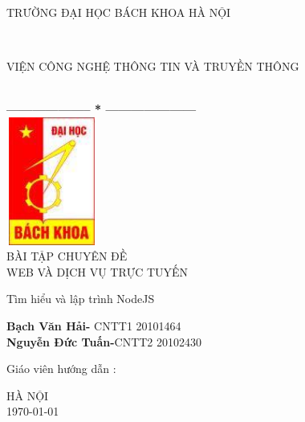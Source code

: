 ﻿\thispagestyle{empty}
\thisfancypage{
\setlength{\fboxsep}{0pt}
\fbox}{} 
\begin{center}
    \begin{large}
        \textcolor[rgb]{1.00,0.00,0.00}{TRƯỜNG ĐẠI HỌC BÁCH KHOA HÀ NỘI}
    \end{large} \\
    \begin{large}
        \textcolor[rgb]{1.00,0.00,0.00}{VIỆN CÔNG NGHỆ THÔNG TIN VÀ TRUYỀN THÔNG}
    \end{large} \\

    \textbf{--------------------  *  ---------------------}\\[2cm]

    \includegraphics[width=3cm, height=4.2cm]{logo}\\[1cm]
    {\fontsize{32pt}{1}\selectfont BÀI TẬP CHUYÊN ĐỀ}\\
    {\fontsize{20pt}{1}\selectfont WEB VÀ DỊCH VỤ TRỰC TUYẾN}\\[2cm]
\end{center}

\hspace{5cm}  Tìm hiểu và lập trình NodeJS
\begin{flushright}
    \parbox[t]{8cm}{
    \textbf{Bạch Văn Hải- }CNTT1 20101464\\
    \textbf{Nguyễn Đức Tuấn-}CNTT2 20102430\\
	}
\end{flushright}

\hspace{5cm} Giáo viên hướng dẫn\hspace{24pt} :
\begin{flushright} \textbf{\parbox[t]{8cm}{    
        \textcolor[rgb]{0.00,0.00,1.00}{Tạ Tuấn Anh}
        }}
\end{flushright}
    \vspace{2cm}
\begin{center}
        {\fontsize{16pt}{1}\selectfont HÀ NỘI}\\
        {\fontsize{16pt}{1}\today}
\end{center}

